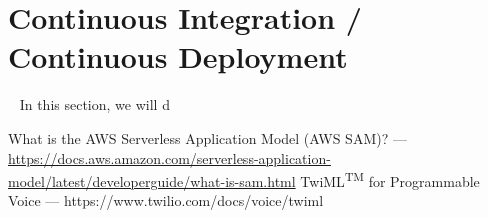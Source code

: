 \documentclass[10pt, a4paper]{article}
\begin{document}
\section{Continuous Integration / Continuous Deployment}
\label{sec:cicd}
\par ~ In this section, we will d


\begin{thebibliography}{9}
What is the AWS Serverless Application Model (AWS SAM)? --- \url{https://docs.aws.amazon.com/serverless-application-model/latest/developerguide/what-is-sam.html}
TwiML\textsuperscript{TM} for Programmable Voice --- https://www.twilio.com/docs/voice/twiml

\end{thebibliography}
\end{document}
